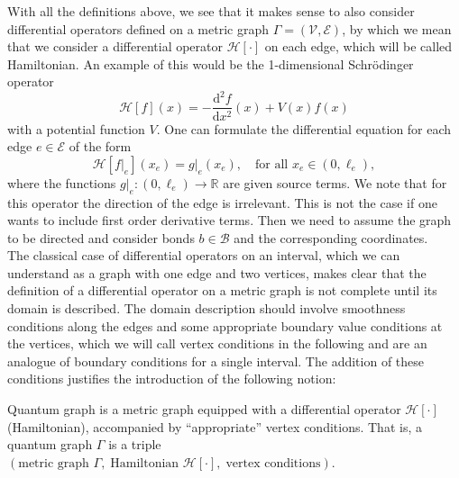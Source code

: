 With all the definitions above, we see that it makes sense to also consider differential operators defined on a metric graph $\Gamma = (\mathcal{V}, \mathcal{E})$, by which we mean that we consider a differential operator $\mathcal{H} \left[ \cdot \right]$ on each edge, which will be called Hamiltonian. An example of this would be the 1-dimensional Schrödinger operator
\begin{equation*}
    \mathcal{H} \left[ f \right](x) = -\frac{\mathrm{d}^2 f}{\mathrm{d} x^2}(x) + V(x)f(x)
\end{equation*}
with a potential function $V$. One can formulate the differential equation for each edge $e \in \mathcal{E}$ of the form
\begin{equation*}
    \mathcal{H} \left[ f |_e \right] (x_e) = g|_e(x_e), \quad \text{for all  } x_e \in (0, \ell_e),
\end{equation*}
where the functions $g|_e \colon (0, \ell_e) \to \mathbb{R}$ are given source terms. We note that for this operator the direction of the edge is irrelevant. This is not the case if one wants to include first order derivative terms. Then we need to assume the graph to be directed and consider bonds $b \in \mathcal{B}$ and the corresponding coordinates. \\
The classical case of differential operators on an interval, which we can understand as a graph with one edge and two vertices, makes clear that the definition of a differential operator on a metric graph is not complete until its domain is described. The domain description should involve smoothness conditions along the edges and some appropriate boundary value conditions at the vertices, which we will call vertex conditions in the following and are an analogue of boundary conditions for a single interval. The addition of these conditions justifies the introduction of the following notion:

\begin{definition}
    \label{quantum graph}
    Quantum graph is a metric graph equipped with a differential operator $\mathcal{H} \left[ \cdot \right]$ (Hamiltonian), accompanied by “appropriate” vertex conditions. That is, a quantum graph $\Gamma$ is a triple \\
    $(\text{metric graph } \Gamma, \; \text{Hamiltonian } \mathcal{H} \left[ \cdot \right], \; \text{vertex conditions})$.
\end{definition}

